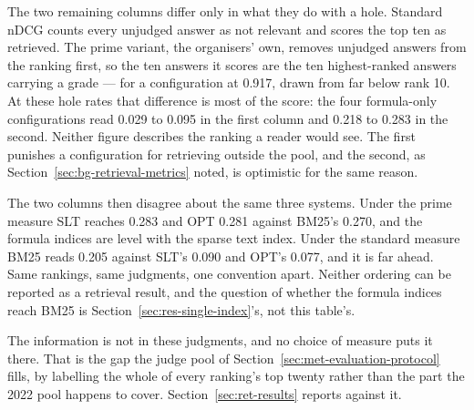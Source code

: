 The two remaining columns differ only in what they do with a hole. Standard nDCG counts
every unjudged answer as not relevant and scores the top ten as retrieved. The prime
variant, the organisers' own, removes unjudged answers from the ranking first, so the ten
answers it scores are the ten highest-ranked answers carrying a grade --- for a
configuration at 0.917, drawn from far below rank 10. At these hole rates that difference
is most of the score: the four formula-only configurations read 0.029 to 0.095 in the
first column and 0.218 to 0.283 in the second. Neither figure describes the ranking a
reader would see. The first punishes a configuration for retrieving outside the pool, and
the second, as Section~\ref{sec:bg-retrieval-metrics} noted, is optimistic for the same
reason.

The two columns then disagree about the same three systems. Under the prime measure SLT
reaches 0.283 and OPT 0.281 against BM25's 0.270, and the formula indices are level with
the sparse text index. Under the standard measure BM25 reads 0.205 against SLT's 0.090 and
OPT's 0.077, and it is far ahead. Same rankings, same judgments, one convention apart.
Neither ordering can be reported as a retrieval result, and the question of whether the
formula indices reach BM25 is Section~\ref{sec:res-single-index}'s, not this table's.

The information is not in these judgments, and no choice of measure puts it there. That is
the gap the judge pool of Section~\ref{sec:met-evaluation-protocol} fills, by labelling the
whole of every ranking's top twenty rather than the part the 2022 pool happens to cover.
Section~\ref{sec:ret-results} reports against it.


